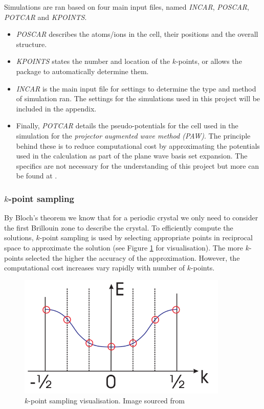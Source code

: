 \documentclass[a4paper,12pt]{article}
\begin{document}
Simulations are ran based on four main input files, named \textit{INCAR}, \textit{POSCAR}, \textit{POTCAR} and \textit{KPOINTS}.
\begin{itemize}
\item \textit{POSCAR} describes the atoms/ions in the cell, their positions and the overall structure.

\item \textit{KPOINTS} states the number and location of the $k$-points, or allows the package to automatically determine them.

\item \textit{INCAR} is the main input file for settings to determine the type and method of simulation ran. The settings for the simulations used in this project will be included in the appendix.

\item Finally, \textit{POTCAR} details the pseudo-potentials for the cell used in the simulation for the \textit{projector augmented wave method (PAW)}. The principle behind these is to reduce computational cost by approximating the potentials used in the calculation as part of the plane wave basis set expansion. The specifics are not necessary for the understanding of this project but more can be found at \cite{DFTintro, DFTA, PAWintro}.
\end{itemize}

\subsubsection{$k$-point sampling}

By Bloch's theorem \cite{Bloch1929} we know that for a periodic crystal we only need to consider the first Brillouin zone to describe the crystal. To efficiently compute the solutions, $k$-point sampling is used by selecting appropriate points in reciprocal space to approximate the solution (see Figure \ref{Fig5} for visualisation). The more $k$-points selected the higher the accuracy of the approximation. However, the computational cost increases vary rapidly with number of $k$-points.

\begin{figure}[h!!!!]
	\centering
	\includegraphics[width=10cm]{figures/kpointsamp.png}
	\caption{$k$-point sampling visualisation. Image sourced from \cite{KPoints}}
	\label{Fig5}
\end{figure}
\end{document}
